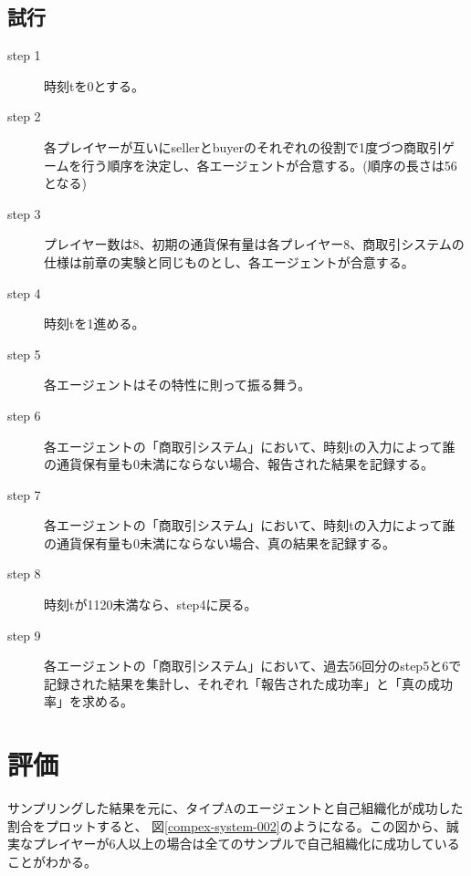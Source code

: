   \subsection{試行}
    \begin{description}
      \item[step 1] 時刻tを0とする。
      \item[step 2] 各プレイヤーが互いにsellerとbuyerのそれぞれの役割で1度づつ商取引ゲームを行う順序を決定し、各エージェントが合意する。(順序の長さは56となる)
      \item[step 3] プレイヤー数は8、初期の通貨保有量は各プレイヤー8、商取引システムの仕様は前章の実験と同じものとし、各エージェントが合意する。
      \item[step 4] 時刻tを1進める。
      \item[step 5] 各エージェントはその特性に則って振る舞う。
      \item[step 6] 各エージェントの「商取引システム」において、時刻tの入力によって誰の通貨保有量も0未満にならない場合、報告された結果を記録する。
      \item[step 7] 各エージェントの「商取引システム」において、時刻tの入力によって誰の通貨保有量も0未満にならない場合、真の結果を記録する。
      \item[step 8] 時刻tが1120未満なら、step4に戻る。
      \item[step 9] 各エージェントの「商取引システム」において、過去56回分のstep5と6で記録された結果を集計し、それぞれ「報告された成功率」と「真の成功率」を求める。
    \end{description}

\section{評価}

サンプリングした結果を元に、タイプAのエージェントと自己組織化が成功した割合をプロットすると、
図\ref{compex-system-002}のようになる。この図から、誠実なプレイヤーが6人以上の場合は全てのサンプルで自己組織化に成功していることがわかる。

